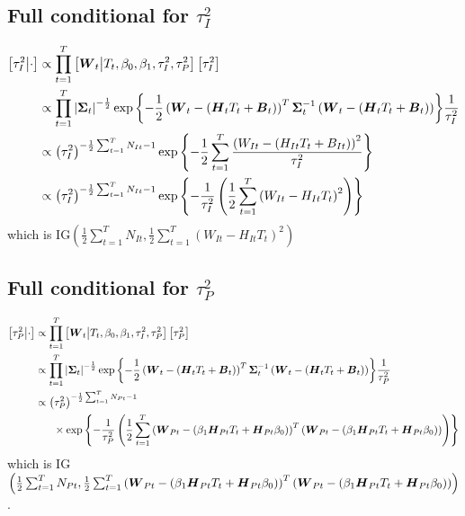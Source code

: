 \documentclass{article}\usepackage[]{graphicx}\usepackage[]{color}
\def\bm#1{\mbox{\boldmath $#1$}}
\begin{document}
\subsection{Full conditional for $\tau^2_I$}
%
\begin{align*}
%
\left[ \tau^2_I \middle| \cdot \right] & \propto \prod_{t = 1}^T \left[ \bm{W}_t \middle| T_t, \beta_0, \beta_1, \tau^2_I, \tau^2_P \right] \left[ \tau^2_I \right] \\
%
& \propto \prod_{t = 1}^T \left| \bm{\Sigma}_t \right|^{ - \frac{1} {2}} \exp{ \left\{ - \frac{1} {2} \left( \bm{W}_t - \left( \bm{H}_t T_t + \bm{B}_t \right) \right)^T \bm{\Sigma}_t^{ - 1} \left( \bm{W}_t - \left( \bm{H}_t T_t + \bm{B}_t \right) \right) \right\} } \frac{1} {\tau^2_I}\\
%
& \propto \left( \tau^2_I \right)^{ - \frac{1} {2} \sum_{t = 1}^T N_{It} - 1} \exp{ \left\{ - \frac{1} {2} \sum_{t = 1}^T \frac{\left( W_{It} - \left( H_{It} T_t + B_{It} \right) \right)^2} {\tau^2_I} \right\} } \\
%
& \propto \left( \tau^2_I \right)^{ - \frac{1} {2} \sum_{t = 1}^T N_{It} - 1} \exp{ \left\{ - \frac{1} {\tau^2_I} \left( \frac{1} {2} \sum_{t = 1}^T \left( W_{It} - H_{It} T_t \right)^2 \right) \right\} } \\
%
\end{align*}
%
which is IG$\left( \frac{1} {2} \sum_{t = 1}^T N_{It}, \frac{1} {2} \sum_{t = 1}^T \left( W_{It} - H_{It} T_t \right)^2 \right)$
%
%
\subsection{Full conditional for $\tau^2_P$}
%
\begin{align*}
%
\left[ \tau^2_P \middle| \cdot \right] & \propto \prod_{t = 1}^T \left[ \bm{W}_t \middle| T_t, \beta_0, \beta_1, \tau^2_I, \tau^2_P \right] \left[ \tau^2_P \right] \\
%
& \propto \prod_{t = 1}^T \left| \bm{\Sigma}_t \right|^{ - \frac{1} {2}} \exp{ \left\{ - \frac{1} {2} \left( \bm{W}_t - \left( \bm{H}_t T_t + \bm{B}_t \right) \right)^T \bm{\Sigma}_t^{ - 1} \left( \bm{W}_t - \left( \bm{H}_t T_t + \bm{B}_t \right) \right) \right\} } \frac{1} {\tau^2_P}\\
%
& \propto \left( \tau^2_P \right)^{ - \frac{1} {2} \sum_{t = 1}^T N_{Pt} - 1}\\
& \hspace{6mm} \times \exp{ \left\{ - \frac{1} {\tau^2_P} \left( \frac{1} {2} \sum_{t = 1}^T \left( \bm{W}_{Pt} - \left( \beta_1 \bm{H}_{Pt} T_t + \bm{H}_{P t} \beta_0 \right) \right)^T \left( \bm{W}_{Pt} - \left( \beta_1 \bm{H}_{Pt} T_t + \bm{H}_{Pt} \beta_0 \right) \right) \right) \right\} }\\
%
\end{align*}
%
which is IG$\left( \frac{1} {2} \sum_{t = 1}^T N_{Pt}, \frac{1} {2} \sum_{t = 1}^T \left( \bm{W}_{Pt} - \left( \beta_1 \bm{H}_{Pt} T_t + \bm{H}_{P t} \beta_0 \right) \right)^T \left( \bm{W}_{Pt} - \left( \beta_1 \bm{H}_{Pt} T_t + \bm{H}_{Pt} \beta_0 \right) \right) \right)$. \\
%
%
\end{document}
